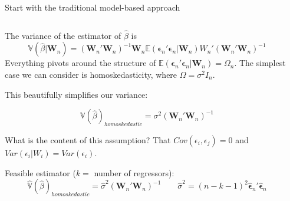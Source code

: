 \documentclass[notes,11pt, aspectratio=169]{beamer}
\newenvironment{wideitemize}{\itemize\addtolength{\itemsep}{10pt}}{\enditemize}
\begin{document}
\begin{frame}{Start with the traditional model-based approach}
\begin{columns}[T] %
\begin{column}{.8\textwidth}
  \begin{wideitemize}
  \item The variance of the estimator of $\hat{\beta}$ is
    \begin{equation}
      \mathbb{V}(\hat{\beta} |\mathbf{W}_{n}) = (\mathbf{W}_{n}'\mathbf{W}_{n})^{-1}\mathbf{W}_{n}\mathbb{E}(\boldsymbol{\epsilon}_{n}'\boldsymbol{\epsilon}_{n}|\mathbf{W}_{n})W_{n}' (\mathbf{W}_{n}'\mathbf{W}_{n})^{-1}
    \end{equation}
    Everything pivots around the structure of
    $\mathbb{E}(\boldsymbol{\epsilon}_{n}'\boldsymbol{\epsilon}_{n}|\mathbf{W}_{n}) = \Omega_{n}$. The simplest case we can consider is homoskedasticity, where $\Omega = \sigma^{2}I_{n}$.
    \item This beautifully simplifies our variance:
    
    \begin{equation}
      \mathbb{V}(\hat{\beta})_{homoskedastic} = \sigma^{2} (\mathbf{W}_{n}'\mathbf{W}_{n})^{-1}
    \end{equation}
  \item What is the content of this assumption? That $Cov(\epsilon_{i},\epsilon_{j}) = 0$ and  $Var(\epsilon_{i} |W_{i}) = Var(\epsilon_{i})$.
  \item Feasible estimator ($k =$ number of regressors):
    \begin{equation}
      \hat{\mathbb{V}}(\hat{\beta})_{homoskedastic} = \hat{\sigma}^{2} (\mathbf{W}_{n}'\mathbf{W}_{n})^{-1}  \qquad \hat{\sigma}^{2} = (n-k-1)^{2}\boldsymbol{\hat{\epsilon}}_{n}' \boldsymbol{\hat{\epsilon}}_{n} 
    \end{equation}
  \end{wideitemize}
  \end{column}%
  \hfill%
  \begin{column}{.5\textwidth}
  \end{column}
\end{columns}
  
\end{frame}
\end{document}
